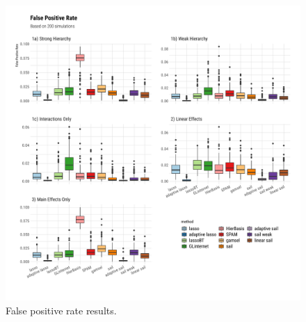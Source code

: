 \begin{knitrout}\scriptsize
	\color{fgcolor}\begin{figure}[H]
		
		{\centering \includegraphics[width=1\linewidth]{figs/plot-fpr-sim-1} 
			
		}
		
		\caption[False positive rate results]{False positive rate results.}\label{fig:plot-fpr-sim}
	\end{figure}
	
	
\end{knitrout}

